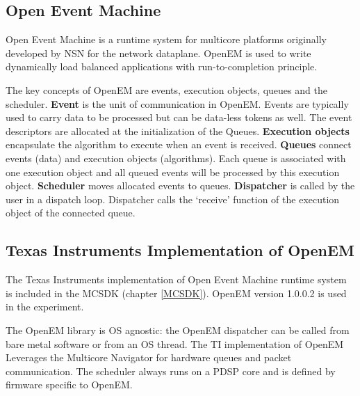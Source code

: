 \subsection{Open Event Machine}
Open Event Machine is a runtime system for multicore platforms originally developed by NSN for the network dataplane. OpenEM is used to write dynamically load balanced applications with run-to-completion principle.

The key concepts of OpenEM are events, execution objects, queues and the scheduler. \textbf{Event} is the unit of communication in OpenEM. Events are typically used to carry data to be processed but can be data-less tokens as well. The event descriptors are allocated at the initialization of the Queues. \textbf{Execution objects} encapsulate the algorithm to execute when an event is received. \textbf{Queues} connect events (data) and execution objects (algorithms). Each queue is associated with one execution object and all queued events will be processed by this execution object. \textbf{Scheduler} moves allocated events to queues. \textbf{Dispatcher} is called by the user in a dispatch loop. Dispatcher calls the ‘receive’ function of the execution object of the connected queue.

\subsection{Texas Instruments Implementation of OpenEM}
The Texas Instruments implementation of Open Event Machine runtime system is included in the MCSDK (chapter \ref{MCSDK}). OpenEM version 1.0.0.2 is used in the experiment.

The OpenEM library is OS agnostic: the OpenEM dispatcher can be called from bare metal software or from an OS thread. The TI implementation of OpenEM Leverages the Multicore Navigator for hardware queues and packet communication. The scheduler always runs on a PDSP core and is defined by firmware specific to OpenEM.

